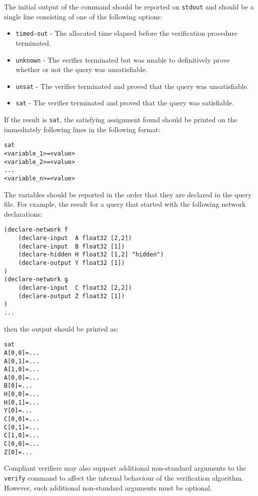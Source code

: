 

\noindent The initial output of the command should be reported on \texttt{stdout} and should be a single line consisting of one of the following options: 
\begin{itemize}
\item \texttt{timed-out} - The allocated time elapsed before the verification procedure terminated.
\item \texttt{unknown} - The verifier terminated but was unable to definitively prove whether or not the query was unsatisfiable.
\item \texttt{unsat} - The verifier terminated and proved that the query was unsatisfiable.
\item \texttt{sat} - The verifier terminated and proved that the query was satisfiable.
\end{itemize}
If the result is \texttt{sat}, the satisfying assignment found should be printed on the immediately following lines in the following format:
\begin{lstlisting}[style=bash]
sat
<variable_1>=<value>
<variable_2>=<value>
...
<variable_n>=<value>
\end{lstlisting}
The variables should be reported in the order that they are declared in the query file. For example, the result for a \vnnlib{} query that started with the following network declarations:
\begin{lstlisting}[style=bash]
(declare-network f
    (declare-input  A float32 [2,2])
    (declare-input  B float32 [1])
    (declare-hidden H float32 [1,2] "hidden")
    (declare-output Y float32 [1])
)
(declare-network g
    (declare-input  C float32 [2,2])
    (declare-output Z float32 [1])
)
...
\end{lstlisting}
then the output should be printed as:
\begin{lstlisting}[style=bash]
sat
A[0,0]=...
A[0,1]=...
A[1,0]=...
A[0,0]=...
B[0]=...
H[0,0]=...
H[0,1]=...
Y[0]=...
C[0,0]=...
C[0,1]=...
C[1,0]=...
C[0,0]=...
Z[0]=...
\end{lstlisting}
Compliant verifiers may also support additional non-standard arguments to the \texttt{verify} command to affect the internal behaviour of the verification algorithm. However, such additional non-standard arguments must be optional.

